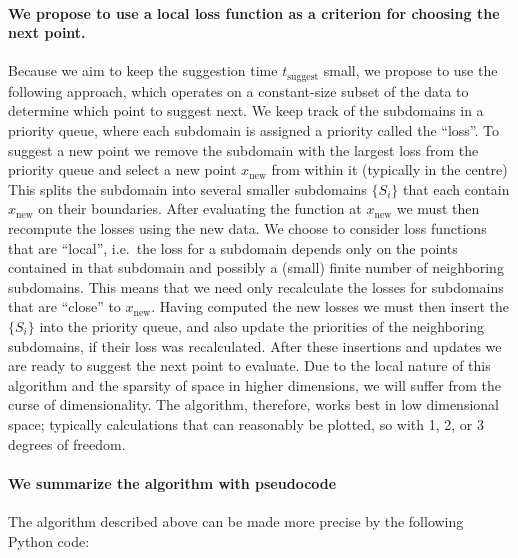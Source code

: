 \documentclass[english, twocolumn, 10pt, aps, superscriptaddress, floatfix, prb, citeautoscript]{revtex4-1}
\begin{document}
\paragraph{We propose to use a local loss function as a criterion for choosing the next point.}

Because we aim to keep the suggestion time \(t_\textrm{suggest}\) small, we propose to use the following approach, which operates on a constant-size subset of the data to determine which point to suggest next.
We keep track of the subdomains in a priority queue, where each subdomain is assigned a priority called the ``loss''.
To suggest a new point we remove the subdomain with the largest loss from the priority queue and select a new point \(x_\textrm{new}\) from within it (typically in the centre)
This splits the subdomain into several smaller subdomains \(\{S_i\}\) that each contain \(x_\textrm{new}\) on their boundaries.
After evaluating the function at \(x_\textrm{new}\) we must then recompute the losses using the new data.
We choose to consider loss functions that are ``local'', i.e.~the loss for a subdomain depends only on the points contained in that subdomain and possibly a (small) finite number of neighboring subdomains.
This means that we need only recalculate the losses for subdomains that are ``close'' to \(x_\textrm{new}\).
Having computed the new losses we must then insert the \(\{S_i\}\) into the priority queue, and also update the priorities of the neighboring subdomains, if their loss was recalculated.
After these insertions and updates we are ready to suggest the next point to evaluate.
Due to the local nature of this algorithm and the sparsity of space in higher dimensions, we will suffer from the curse of dimensionality.
The algorithm, therefore, works best in low dimensional space; typically calculations that can reasonably be plotted, so with 1, 2, or 3 degrees of freedom.

\paragraph{We summarize the algorithm with pseudocode}

The algorithm described above can be made more precise by the following Python code:
\end{document}
